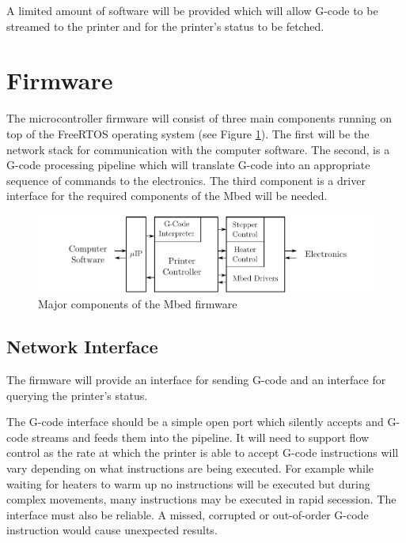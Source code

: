 		A limited amount of software will be provided which will allow G-code to be
		streamed to the printer and for the printer's status to be fetched.
	
	\section{Firmware}
		
		The microcontroller firmware will consist of three main components running
		on top of the FreeRTOS operating system (see Figure
		\ref{fig:systemDiagramFirmware}). The first will be the \uIP{} network stack
		for communication with the computer software. The second, is a G-code
		processing pipeline which will translate G-code into an appropriate sequence
		of commands to the electronics. The third component is a driver interface
		for the required components of the Mbed will be needed.
		
		\begin{figure}[here]
			\includegraphics[width=1\textwidth]{diagrams/systemDiagramFirmware.pdf}
			\caption{Major components of the Mbed firmware}
			\label{fig:systemDiagramFirmware}
		\end{figure}
		
		\subsection{Network Interface}
			
			
			The firmware will provide an interface for sending G-code and an interface
			for querying the printer's status.
			
			The G-code interface should be a simple open port which silently accepts
			and G-code streams and feeds them into the pipeline. It will need to
			support flow control as the rate at which the printer is able to accept
			G-code instructions will vary depending on what instructions are being
			executed. For example while waiting for heaters to warm up no instructions
			will be executed but during complex movements, many instructions may be
			executed in rapid secession. The interface must also be reliable. A
			missed, corrupted or out-of-order G-code instruction would cause
			unexpected results.
			
